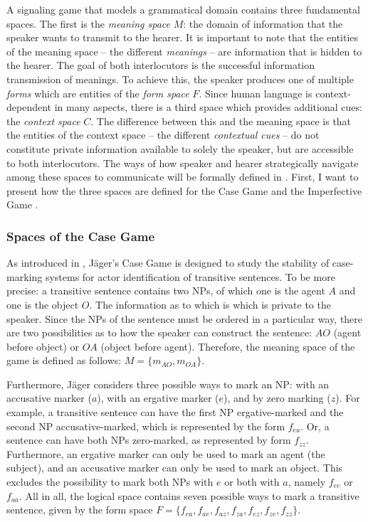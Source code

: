 \documentclass[output=paper,hidelinks]{langscibook}
\begin{document}
A signaling game that models a grammatical domain contains three fundamental spaces. The first is the \emph{meaning space} $M$: the domain of information that the speaker wants to transmit to the hearer. It is important to note that the entities of the meaning space -- the different \emph{meanings} -- are information that is hidden to the hearer. The goal of both interlocutors is the successful information transmission of meanings. To achieve this, the speaker produces one of multiple \emph{forms} which are entities of the \emph{form space} $F$. Since human language is context-dependent in many aspects, there is a third space which provides additional cues: the \emph{context space} $C$. The difference between this and the meaning space is that the entities of the context space -- the different \emph{contextual cues} -- do not constitute private information available to solely the speaker, but are accessible to both interlocutors. The ways of how speaker and hearer strategically navigate among these spaces to communicate will be formally defined in . First, I want to present how the three spaces are defined for the Case Game \citep{Jaeger07} and the Imperfective Game \citep{Deo_2015}.

\subsubsection{Spaces of the Case Game}

As introduced in , Jäger's Case Game is designed to study the stability of case-marking systems for actor identification of transitive sentences. To be more precise: a transitive sentence contains two NPs, of which one is the agent $A$ and one is the object $O$. The information as to which  is which is private to the speaker. Since the NPs of the sentence must be ordered in a particular way, there are two possibilities as to how the speaker can construct the sentence: $AO$ (agent before object) or $OA$ (object before agent). Therefore, the meaning space of the game is defined as follows:  $M =  \{m_{AO}, m_{OA} \}$. 

Furthermore, Jäger considers three possible ways to mark an NP: with an accusative marker ($a$), with an ergative marker ($e$), and by zero marking ($z$). For example, a transitive sentence can have the first NP ergative-marked and the second NP accusative-marked, which is represented by the form $f_{ea}$. Or, a sentence can have both NPs zero-marked, as represented by form $f_{zz}$. 
Furthermore, an ergative marker can only be used to mark an agent (the subject), and an accusative marker can only be used to mark an object. This excludes the possibility to mark both NPs with $e$ or both with $a$, namely $f_{ee}$ or $f_{aa}$. 
All in all, the logical space contains seven possible ways to mark a transitive sentence, given by the form space $F =  \{f_{ea}, f_{ae}, f_{az}, f_{za}, f_{ez}, f_{ze}, f_{zz} \}$.
\end{document}

